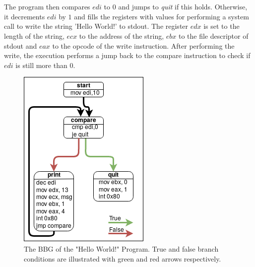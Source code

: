 \documentclass{kththesis}
\renewcommand{\it}[1]{\textit{#1}}
\begin{document}
\\ \\
The program then compares $edi$ to $0$ and jumps to \it{quit} if this holds. Otherwise, it decrements $edi$ by $1$ and fills the registers with values for performing a system call to write the string 'Hello World!' to stdout. The register $edx$ is set to the length of the string, $ecx$ to the address of the string, $ebx$ to the file descriptor of stdout and $eax$ to the opcode of the write instruction. After performing the write, the execution performs a jump back to the compare instruction to check if $edi$ is still more than $0$.
\begin{figure}[!t]
    \centering
    \includegraphics[scale=0.6]{Images/BBGExample.png}
    \caption[The BBG of the "Hello World!" Program.]{The BBG of the "Hello World!" Program. True and false branch conditions are illustrated with green and red arrows respectively.}
    \label{fig:HelloBBG}
\end{figure}
\noindent
\end{document}
